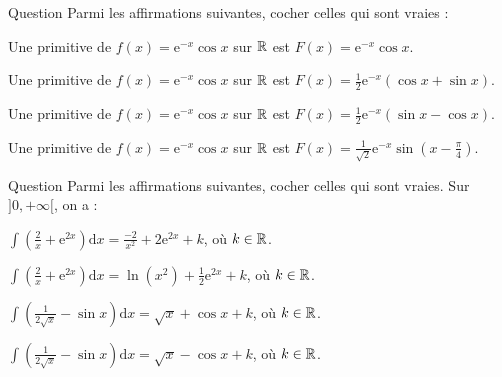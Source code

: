 \begin{multi}[multiple,feedback=
{\(\displaystyle \left[\frac{1}{2}\mathrm{e}^{-x}\left(\sin x-\cos x\right)\right]'=\mathrm{e}^{-x}\cos x\) et \(\displaystyle \left[\frac{1}{\sqrt{2}}\mathrm{e}^{-x}\sin \left(x-\frac{\pi}{4}\right)\right]'=\mathrm{e}^{-x}\cos x\). Donc \(\displaystyle \frac{1}{2}\mathrm{e}^{-x}\left(\sin x-\cos x\right)\) et \(\displaystyle \frac{1}{\sqrt{2}}\mathrm{e}^{-x}\sin \left(x-\frac{\pi}{4}\right)\) sont des primitives de \(\displaystyle \mathrm{e}^{-x}\cos x\) sur \(\Rr\).
}]{Question}
Parmi les affirmations suivantes, cocher celles qui sont vraies :

    \item Une primitive de \(\displaystyle f(x)=\mathrm{e}^{-x}\cos x\) sur \(\Rr\) est \(\displaystyle F(x)=\mathrm{e}^{-x}\cos x\).
    \item Une primitive de \(\displaystyle f(x)=\mathrm{e}^{-x}\cos x\) sur \(\Rr\) est \(\displaystyle F(x)=\frac{1}{2}\mathrm{e}^{-x}\left(\cos x+\sin x\right)\).
    \item* Une primitive de \(\displaystyle f(x)=\mathrm{e}^{-x}\cos x\) sur \(\Rr\) est \(\displaystyle F(x)=\frac{1}{2}\mathrm{e}^{-x}\left(\sin x-\cos x\right)\).
    \item* Une primitive de \(\displaystyle f(x)=\mathrm{e}^{-x}\cos x\) sur \(\Rr\) est \(\displaystyle F(x)=\frac{1}{\sqrt{2}}\mathrm{e}^{-x}\sin \left(x-\frac{\pi}{4}\right)\).
\end{multi}


\begin{multi}[multiple,feedback=
{On a : \(\displaystyle \int \frac{2\, \mathrm{d}x}{x}=\ln (x^2)+k\) et \(\displaystyle \int\mathrm{e}^{2x}\mathrm{d}x=\frac{1}{2}\mathrm{e}^{2x}+k\). D'où, par linéarité,
\[\int \left(\frac{2}{x}+\mathrm{e}^{2x}\right)\mathrm{d}x=\ln (x^2)+\frac{1}{2}\mathrm{e}^{2x}+k.\]
De même, on vérifie que : \(\displaystyle \int \left(\frac{1}{2\sqrt{x}}-\sin x\right)\mathrm{d}x=\sqrt{x}+\cos x+k\), où \(k\in \Rr\).
}]{Question}
Parmi les affirmations suivantes, cocher celles qui sont vraies. Sur \(]0,+\infty[\), on a :

    \item \(\displaystyle \int \left(\frac{2}{x}+\mathrm{e}^{2x}\right)\mathrm{d}x=\frac{-2}{x^2}+2\mathrm{e}^{2x}+k\), où \(k\in \Rr\).
    \item* \(\displaystyle \int \left(\frac{2}{x}+\mathrm{e}^{2x}\right)\mathrm{d}x=\ln (x^2)+\frac{1}{2}\mathrm{e}^{2x}+k\), où \(k\in \Rr\).
    \item* \(\displaystyle \int \left(\frac{1}{2\sqrt{x}}-\sin x\right)\mathrm{d}x=\sqrt{x}+\cos x+k\), où \(k\in \Rr\).
    \item \(\displaystyle \int \left(\frac{1}{2\sqrt{x}}-\sin x\right)\mathrm{d}x=\sqrt{x}-\cos x+k\), où \(k\in \Rr\).
\end{multi}


